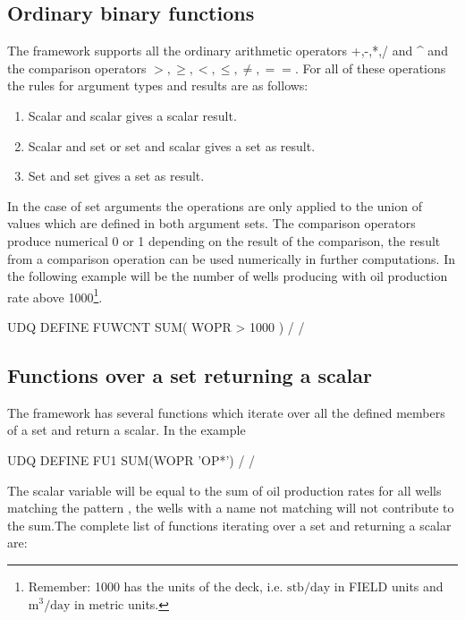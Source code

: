 \subsection{Ordinary binary functions}
The \udq{} framework supports all the ordinary arithmetic operators +,-,*,/ and
\^{} and the comparison operators $>, \ge, <, \le, \ne, ==$. For all of these
operations the rules for argument types and results are as follows:
\begin{enumerate}
\item Scalar and scalar gives a scalar result.
\item Scalar and set or set and scalar gives a set as result.
\item Set and set gives a set as result.
\end{enumerate}
In the case of set arguments the operations are only applied to the union of
values which are defined in both argument sets. The comparison operators produce
numerical 0 or 1 depending on the result of the comparison, the result from a
comparison operation can be used numerically in further computations. In the
following example  will be the number of wells producing with oil
production rate above 1000\footnote{Remember: 1000 has the units of the
deck, i.e. $\mathrm{stb/day}$ in FIELD units and $\mathrm{m^3/day}$ in metric
units.}.
\begin{deck}
UDQ
  DEFINE FUWCNT SUM( WOPR > 1000 ) /
/
\end{deck}



\subsection{Functions over a set returning a scalar}
The \udq{} framework has several functions which iterate over all the defined
members of a set and return a scalar. In the example

\begin{deck}
UDQ
  DEFINE FU1 SUM(WOPR 'OP*') /
/
\end{deck}
The scalar variable  will be equal to the sum of oil production rates
for all wells matching the pattern , the wells with a name not matching
 will not contribute to the sum.The complete list of functions iterating
over a set and returning a scalar are:

